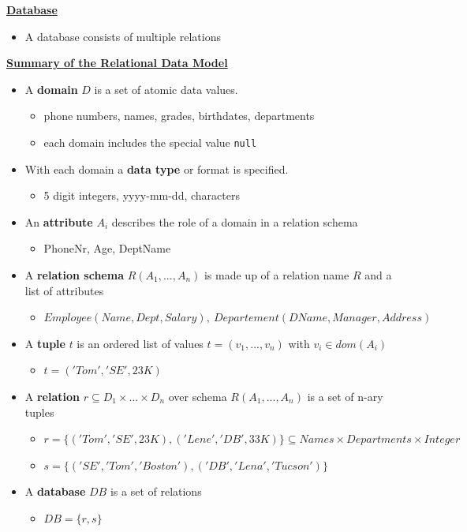 \textbf{\underline{Database}}
\begin{itemize}[label=\(\rhd\)]
    \item A database consists of multiple relations
\end{itemize}

\textbf{\underline{Summary of the Relational Data Model}}
\begin{itemize}[label=\(\rhd\)]
    \item A \textbf{domain} $D$ is a set of atomic data values.
    \begin{itemize}[label=\(\rhd\)]
        \item phone numbers, names, grades, birthdates, departments
        \item each domain includes the special value \texttt{null}
    \end{itemize}
    \item With each domain a \textbf{data type} or format is specified.
    \begin{itemize}[label=\(\rhd\)]
        \item 5 digit integers, yyyy-mm-dd, characters
    \end{itemize}
    \item An \textbf{attribute} $A_i$ describes the role of a domain in a relation schema
    \begin{itemize}[label=\(\rhd\)]
        \item PhoneNr, Age, DeptName
    \end{itemize}
    \item A \textbf{relation schema} $R(A_1,...,A_n)$ is made up of a relation name $R$ and a list of attributes
    \begin{itemize}[label=\(\rhd\)]
        \item $Employee(Name,Dept,Salary),\ Departement(DName, Manager, Address)$
    \end{itemize}
    \item A \textbf{tuple} $t$ is an ordered list of values $t=(v_1,...,v_n)$ with $v_i \in dom(A_i)$
    \begin{itemize}[label=\(\rhd\)]
        \item $t=('Tom','SE',23K)$
    \end{itemize}
    \item A \textbf{relation} $r\subseteq D_1 \times ... \times D_n$ over schema $R(A_1,...,A_n)$ is a set of n-ary tuples
    \begin{itemize}[label=\(\rhd\)]
        \item $r= \{('Tom','SE',23K),('Lene','DB',33K)\}\subseteq Names \times Departments \times Integer$
        \item $s=\{('SE', 'Tom','Boston'),('DB','Lena','Tucson')\}$
    \end{itemize}
    \item A \textbf{database} $DB$ is a set of relations
    \begin{itemize}[label=\(\rhd\)]
        \item $DB=\{r,s\}$
    \end{itemize}
\end{itemize}

